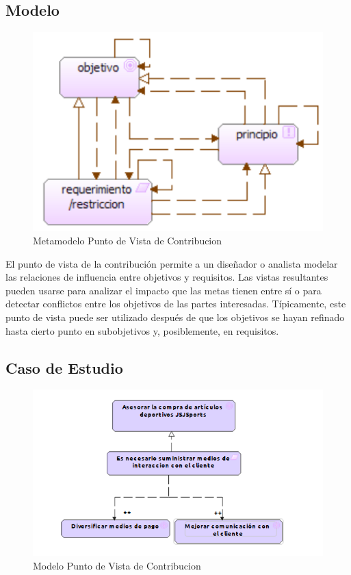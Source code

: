 \subsection{Modelo}
\begin{figure}[th!]
	\centering
	\includegraphics[width=0.6\linewidth]{arquitectura/imagenes/modeloContribucion}
	\caption{Metamodelo Punto de Vista de Contribucion}
	\label{metamodelo contribucion}
\end{figure}
El punto de vista de la contribución permite a un diseñador o analista modelar las relaciones de influencia entre objetivos y requisitos. Las vistas resultantes pueden usarse para analizar el impacto que las metas tienen entre sí o para detectar conflictos entre los objetivos de las partes interesadas.
Típicamente, este punto de vista puede ser utilizado después de que los objetivos se hayan refinado hasta cierto punto en subobjetivos y, posiblemente, en requisitos.

\subsection{Caso de Estudio}

\begin{figure}[th!]
	\centering
	\includegraphics[width=0.9\linewidth]{arquitectura/imagenes/PuntoVistaContribucion}
	\caption{Modelo Punto de Vista de Contribucion}
	\label{modelocontribucion}
\end{figure}

